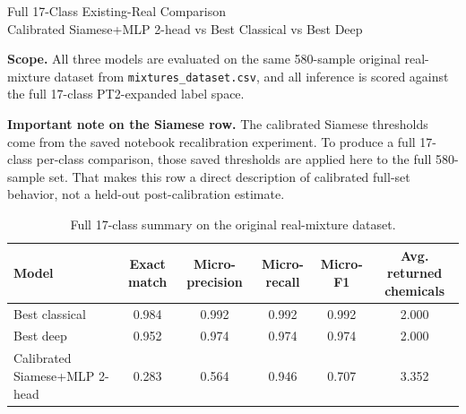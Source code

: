 \documentclass[11pt]{article}
\begin{document}
\begin{center}
{\LARGE Full 17-Class Existing-Real Comparison}\\[0.4em]
{\large Calibrated Siamese+MLP 2-head vs Best Classical vs Best Deep}
\end{center}

\textbf{Scope.} All three models are evaluated on the same 580-sample original real-mixture dataset from \texttt{mixtures\_dataset.csv}, and all inference is scored against the full 17-class PT2-expanded label space.

\textbf{Important note on the Siamese row.} The calibrated Siamese thresholds come from the saved notebook recalibration experiment. To produce a full 17-class per-class comparison, those saved thresholds are applied here to the full 580-sample set. That makes this row a direct description of calibrated full-set behavior, not a held-out post-calibration estimate.

\begin{table}[ht]
\centering
\caption{Full 17-class summary on the original real-mixture dataset.}
\begin{tabular}{lccccc}
\toprule
Model & Exact match & Micro-precision & Micro-recall & Micro-F1 & Avg. returned chemicals \\
\midrule
        Best classical & 0.984 & 0.992 & 0.992 & 0.992 & 2.000 \\
        Best deep & 0.952 & 0.974 & 0.974 & 0.974 & 2.000 \\
        Calibrated Siamese+MLP 2-head & 0.283 & 0.564 & 0.946 & 0.707 & 3.352 \\
\bottomrule
\end{tabular}
\end{table}
\end{document}
